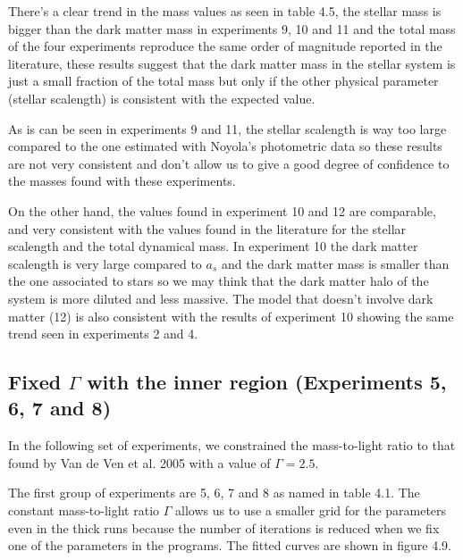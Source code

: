 There's a clear trend in the mass values as seen in table 4.5, the stellar mass is bigger than the dark matter mass in experiments 9, 10 and 11 and the total mass of the four experiments reproduce the same order of magnitude reported in the literature, these results suggest that the dark matter mass in the stellar system is just a small fraction of the total mass but only if the other physical parameter (stellar scalength) is consistent with the expected value. 

As is can be seen in experiments 9 and 11, the stellar scalength is way too large compared to the one estimated with Noyola's photometric data so these results are not very consistent and don't allow us to give a good degree of confidence to the masses found with these experiments. 

On the other hand, the values found in experiment 10 and 12 are comparable, and very consistent with the values found in the literature for the stellar scalength and the total dynamical mass. In experiment 10 the dark matter scalength is very large compared to $a_s$ and the dark matter mass is smaller than the one associated to stars so we may think that the dark matter halo of the system is more diluted and less massive. The model that doesn't involve dark matter (12) is also consistent with the results of experiment 10 showing the same trend seen in experiments 2 and 4.  

\subsection{Fixed $\Gamma$ with the inner region (Experiments 5, 6, 7 and 8)}

In the following set of experiments, we constrained the mass-to-light ratio to that found by Van de Ven et al. 2005 with a value of $\Gamma = 2.5$. 

The first group of experiments are 5, 6, 7 and 8 as named in table 4.1. The constant mass-to-light ratio $\Gamma$ allows us to use a smaller grid for the parameters even in the thick runs because the number of iterations is reduced when we fix one of the parameters in the programs. The fitted curves are shown in figure 4.9. 

